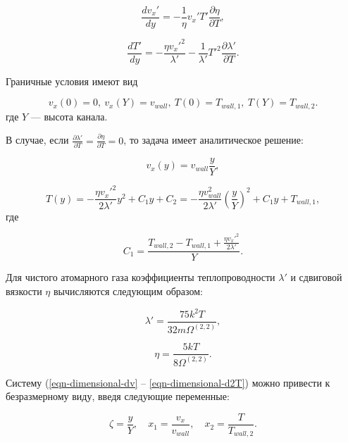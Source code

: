 \documentclass[12pt]{article}
\begin{document}
\begin{equation}
  \frac{d v_{x}'}{d y} = -\frac{1}{\eta} v_{x}' T' \frac{\partial \eta}{\partial T},\label{eqn-dimensional-d2v}
\end{equation}

\begin{equation}
   \frac{dT'}{dy} = -\frac{\eta v_{x}'^2}{\lambda'}
  - \frac{1}{\lambda'} T'^2 \frac{\partial \lambda'}{\partial T}.\label{eqn-dimensional-d2T}
\end{equation}

Граничные условия имеют вид

\begin{equation}
  v_{x}(0) = 0,\:v_{x}(Y) = v_{wall},\:T(0) = T_{wall,1},\:T(Y) = T_{wall,2}.
\end{equation}
где $Y$ --- высота канала.

В случае, если $\frac{\partial \lambda'}{\partial T} = \frac{\partial \eta}{\partial T} = 0$, то задача имеет аналитическое решение:

\begin{equation}
  v_{x}(y) = v_{wall}\frac{y}{Y},
\end{equation}

\begin{equation}
  T(y) = -\frac{\eta v_{x}'^2}{2\lambda'}y^2 + C_{1}y + C_{2} = -\frac{\eta v_{wall}^2}{2\lambda'}\left(\frac{y}{Y}\right)^2 + C_{1}y + T_{wall,1},
\end{equation}
где

\begin{equation}
  C_{1}= \frac{T_{wall,2} - T_{wall,1} +\frac{\eta v_{x}'^2}{2\lambda'}}{Y}.
\end{equation}

Для чистого атомарного газа коэффициенты теплопроводности $\lambda'$ и сдвиговой вязкости $\eta$ вычисляются следующим образом:

\begin{equation}
  \lambda' = \frac{75k^2T}{32m\Omega^{(2,2)}},
\end{equation}

\begin{equation}
  \eta = \frac{5kT}{8\Omega^{(2,2)}}.
\end{equation}

Систему (\ref{eqn-dimensional-dv} -- \ref{eqn-dimensional-d2T}) можно привести к безразмерному виду, введя следующие переменные:

\begin{equation}
  \zeta = \frac{y}{Y},\quad x_{1} = \frac{v_{x}}{v_{wall}},\quad x_{2} = \frac{T}{T_{wall, 2}}.
\end{equation}
\end{document}
